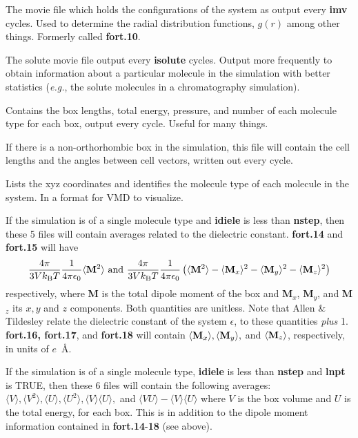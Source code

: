 \documentclass[12pt,letterpaper]{article}
\begin{document}
 The movie file which holds the
configurations of the system as output every {\bf imv}
cycles. Used to determine the radial distribution functions,
$g(r)$ among other things. Formerly called {\bf fort.10}.

 The solute movie file output
every {\bf isolute} cycles. Output more frequently to obtain
information about a particular molecule in the simulation
with better statistics ({\it e.g.}, the solute molecules in
a chromatography simulation).

 Contains the box lengths, total
energy, pressure, and number of each molecule type for each
box, output every cycle. Useful for many things.

 If there is a
non-orthorhombic box in the simulation, this file will
contain the cell lengths and the angles between cell
vectors, written out every cycle.

 Lists the xyz coordinates
and identifies the molecule type of each molecule in the
system. In a format for VMD to visualize.

If the simulation is of a single molecule type and {\bf
  idiele} is less than {\bf nstep}, then these 5 files will
contain averages related to the dielectric constant. {\bf
  fort.14} and {\bf fort.15} will have
\begin{equation}
\frac{4\pi}{3Vk_{\rm B}T} \frac{1}{4\pi\epsilon_0}
\langle {\bf M}^2\rangle
\text{  and  }
\frac{4\pi}{3Vk_{\rm B}T}\frac{1}{4\pi\epsilon_0}
\left(\langle {\bf M}^2\rangle -
\langle {\bf M}_x\rangle^2 -
\langle{\bf M}_y\rangle^2 -
\langle{\bf M}_z\rangle^2 \right)
\end{equation}
respectively, where {\bf M} is the total dipole moment of
the box and {\bf M}$_x$, {\bf M}$_y$, and {\bf M}$_z$ its
$x, y$ and $z$ components. Both quantities are unitless.
Note that Allen \& Tildesley relate the dielectric constant
of the system $\epsilon$, to these quantities {\sl plus} 1.
{\bf fort.16, fort.17}, and {\bf fort.18} will contain
$\langle{\bf M}_x\rangle, \langle{\bf M}_y\rangle,$ and
$\langle{\bf M}_z\rangle$, respectively, in units of
$e$~\AA.

If the simulation is of a single molecule type, {\bf idiele} is less
than {\bf nstep} and {\bf lnpt} is TRUE, then these 6 files will
contain the following averages: $\langle V\rangle, \langle V^2
\rangle, \langle U \rangle, \langle U^2\rangle, \langle V
\rangle\langle U \rangle,$ and $\langle VU \rangle - \langle V \rangle
\langle U \rangle$ where $V$ is the box volume and $U$ is the total
energy, for each box.  This is in addition to the dipole moment
information contained in {\bf fort.14}-{\bf 18} (see above).
\end{document}
